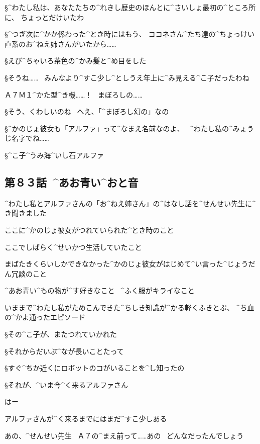 \S ^{わたし}{私}は、あなたたちの^{れきし}{歴史}のほんとに^{さいしょ}{最初}の^{ところ}{所}に、
ちょっとだけいたわ

\S ^{つぎ}{次}に^{かか}{係}わった^{とき}{時}にはもう、
ココネさん^{たち}{達}の^{ちょっけい}{直系}のお^{ねえ}{姉}さんがいたから……

\page
\S えび^{ちゃいろ}{茶色}の^{かみ}{髪}と^{め}{目}をした

\S そうね……
\ みんなより^{すこ}{少}し^{としうえ}{年上}に^{み}{見}える^{こ}{子}だったわね

\K Ａ７Ｍ１^{かた}{型}^{き}{機}……！
\ まぼろしの……

\S そう、くわしいのね
\ へえ、「^{まぼろし}{幻}の」なの

\page
\S ^{かのじょ}{彼女}も「アルファ」って^{なまえ}{名前}なのよ、
\ ^{わたし}{私}の^{みょうじ}{名字}でね……

\S ^{こ}{子}^{うみ}{海}^{いし}{石}アルファ


\subsection{第８３話\ ^{あお}{青}い^{おと}{音}}

\page[84]
\K ^{わたし}{私}とアルファさんの「お^{ねえ}{姉}さん」の^{はなし}{話}を^{せんせい}{先生}に^{き}{聞}きました

\K ここに^{かのじょ}{彼女}がつれていられた^{とき}{時}のこと

\K ここでしばらく^{せいかつ}{生活}していたこと

\page
\K まばたきくらいしかできなかった^{かのじょ}{彼女}がはじめて^{い}{言}った^{じょうだん}{冗談}のこと

\K ^{あお}{青}い^{もの}{物}が^{す}{好}きなこと
\ ^{ふく}{服}がキライなこと

\K いままで^{わたし}{私}がためこんできた^{ちしき}{知識}が^{かる}{軽}くふきとぶ、
^{ち}{血}の^{かよ}{通}ったエピソード

\S その^{こ}{子}が、またつれていかれた

\S それからだいぶ^{なが}{長}いことたって

\S すぐ^{ちか}{近}くにロボットのコがいることを^{し}{知}ったの

\S それが、^{いま}{今}^{く}{来}るアルファさん

\K はー

\page
\K アルファさんが^{く}{来}るまでにはまだ^{すこ}{少}しある

\K あの、^{せんせい}{先生}
\ Ａ７の^{まえ}{前}って……あの
\ どんなだったんでしょう

